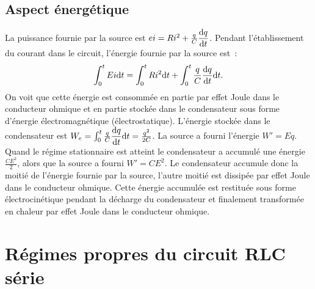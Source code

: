 \subsection{Aspect énergétique}%
La puissance fournie par la source est \(ei = Ri^2 + \frac{q}{C} 
\dfrac{\mathrm{d} q}{\mathrm{d} t}\). Pendant l'établissement du courant dans le circuit, l'énergie 
fournie par la source est~:
\begin{equation}%
  \int_0^t Ei \D t = \int_0^t R i^2 \D t + \int_{0}^{t} \frac{q}{C} 
  \derived{q}{t} \D t.
\end{equation}%
On voit que cette énergie est consommée en partie par effet Joule dans le 
conducteur ohmique et en partie stockée dans le condensateur sous forme 
d'énergie électromagnétique (électrostatique). L'énergie stockée dans le 
condensateur est \(W_e = \int_{0}^{t} \frac{q}{C} \dfrac{\mathrm{d} q}{\mathrm{d} t} \mathrm{d} t = 
\frac{q^2}{2C}\). La source a fourni l'énergie \(W' = Eq\). Quand le régime 
stationnaire est atteint le condensateur a accumulé une énergie 
\(\frac{CE^2}{2}\), alors que la source a fourni \(W' = C E^2\). Le 
condensateur accumule donc la moitié de l'énergie fournie par la source, 
l'autre moitié est dissipée par effet Joule dans le conducteur ohmique. Cette 
énergie accumulée est restituée sous forme électrocinétique pendant la décharge 
du condensateur et finalement transformée en chaleur par effet Joule dans le 
conducteur ohmique.
\section{Régimes propres du circuit RLC série}%
